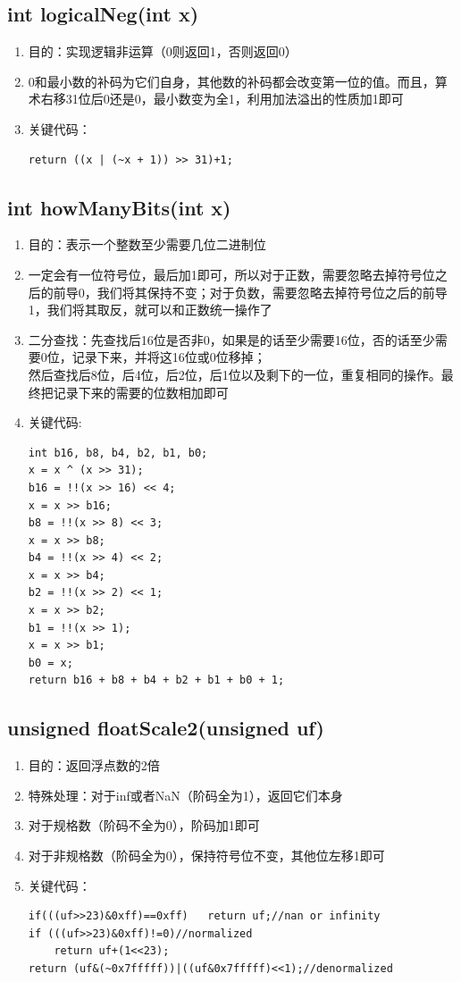 \documentclass[12pt, a4paper, oneside]{ctexart}
\begin{document}
\subsection{int logicalNeg(int x)}
\begin{enumerate}
    \item 目的：实现逻辑非运算（0则返回1，否则返回0）
    \item 0和最小数的补码为它们自身，其他数的补码都会改变第一位的值。而且，算术右移31位后0还是0，最小数变为全1，利用加法溢出的性质加1即可
    \item 关键代码：
\begin{lstlisting}
return ((x | (~x + 1)) >> 31)+1;
\end{lstlisting}
\end{enumerate}
\subsection{int howManyBits(int x)}
\begin{enumerate}
    \item 目的：表示一个整数至少需要几位二进制位
    \item 一定会有一位符号位，最后加1即可，所以对于正数，需要忽略去掉符号位之后的前导0，我们将其保持不变；对于负数，需要忽略去掉符号位之后的前导1，我们将其取反，就可以和正数统一操作了
    \item 二分查找：先查找后16位是否非0，如果是的话至少需要16位，否的话至少需要0位，记录下来，并将这16位或0位移掉；\\
          然后查找后8位，后4位，后2位，后1位以及剩下的一位，重复相同的操作。最终把记录下来的需要的位数相加即可
    \item 关键代码:
\begin{lstlisting}
int b16, b8, b4, b2, b1, b0;
x = x ^ (x >> 31);  
b16 = !!(x >> 16) << 4;  
x = x >> b16; 
b8 = !!(x >> 8) << 3;  
x = x >> b8; 
b4 = !!(x >> 4) << 2;  
x = x >> b4;
b2 = !!(x >> 2) << 1;  
x = x >> b2; 
b1 = !!(x >> 1);  
x = x >> b1;
b0 = x;  
return b16 + b8 + b4 + b2 + b1 + b0 + 1;  
\end{lstlisting}
\end{enumerate}
\subsection{unsigned floatScale2(unsigned uf)}
\begin{enumerate}
    \item 目的：返回浮点数的2倍
    \item 特殊处理：对于inf或者NaN（阶码全为1），返回它们本身
    \item 对于规格数（阶码不全为0），阶码加1即可
    \item 对于非规格数（阶码全为0），保持符号位不变，其他位左移1即可
    \item 关键代码：
\begin{lstlisting}
if(((uf>>23)&0xff)==0xff) 	return uf;//nan or infinity 
if (((uf>>23)&0xff)!=0)//normalized
    return uf+(1<<23);
return (uf&(~0x7fffff))|((uf&0x7fffff)<<1);//denormalized  
\end{lstlisting}
\end{enumerate}
\end{document}
